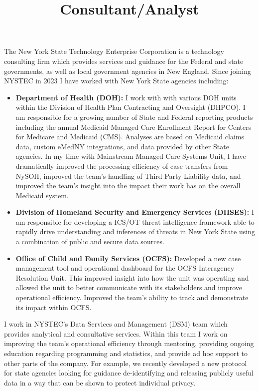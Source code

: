 \documentclass[line, mm, 10pt]{res}
\begin{document}
\begin{resume}
  \title{Consultant/Analyst}
  \begin{position}
    The New York State Technology Enterprise Corporation is a technology
    consulting firm which provides services and guidance for the Federal and
    state governments, as well as local government agencies in New England. Since joining NYSTEC in 2023 I have worked with New York State agencies including:

    \begin{itemize}
    \item \textbf{Department of Health (DOH):} I work with with various DOH units within the Division of Health Plan Contracting and Oversight (DHPCO). I am responsible for a growing number of State and Federal reporting products including the annual Medicaid Managed Care Enrollment Report for Centers for Medicare and Medicaid (CMS). Analyses are based on Medicaid claims data, custom eMedNY integrations, and data provided by other State agencies. In my time with Mainstream Managed Care Systems Unit, I have dramatically improved the processing efficiency of case transfers from NySOH, improved the team's handling of Third Party Liability data, and improved the team's insight into the impact their work has on the overall Medicaid system. 
    \item \textbf{Division of Homeland Security and Emergency Services (DHSES):} I am responsible for developing a ICS/OT threat intelligence framework able to rapidly drive understanding and inferences of threats in New York State using a combination of public and secure data sources.
    \item \textbf{Office of Child and Family Services (OCFS):} Developed a new case management tool and operational dashboard for the OCFS Interagency Resolution Unit. This improved insight into how the unit was operating and allowed the unit to better communicate with its stakeholders and improve operational efficiency. Improved the team's ability to track and demonstrate its impact within OCFS.
    \end{itemize}
    
    I work in NYSTEC's Data Services and Management (DSM) team which provides analytical and consultative services. Within this team I work on improving the team's operational efficiency through mentoring, providing ongoing education regarding programming and statistics, and provide ad hoc support to other parts of the company. For example, we recently developed a new protocol for state agencies looking for guidance de-identifying and releasing publicly useful data in a way that can be shown to protect individual privacy. 
  \end{position}



\end{resume}
\end{document}
